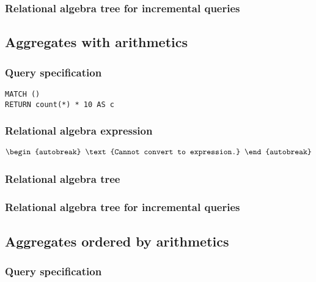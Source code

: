 \subsubsection*{Relational algebra tree for incremental queries}


\subsection{Aggregates with arithmetics}

\subsubsection*{Query specification}

\begin{lstlisting}
MATCH ()
RETURN count(*) * 10 AS c
\end{lstlisting}

\subsubsection*{Relational algebra expression}

\begin{align*}
\begin{autobreak}
\text{Cannot convert to expression.}
\end{autobreak}
\end{align*}

\subsubsection*{Relational algebra tree}


\subsubsection*{Relational algebra tree for incremental queries}


\subsection{Aggregates ordered by arithmetics}

\subsubsection*{Query specification}

